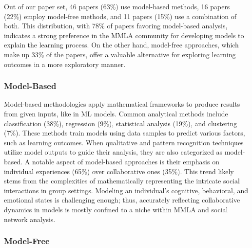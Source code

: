 \documentclass[manuscript,screen,review]{acmart}
\begin{document}
Out of our paper set, 46 papers (63\%) use model-based methods, 16 papers (22\%) employ model-free methods, and 11 papers (15\%) use a combination of both. This distribution, with 78\% of papers favoring model-based analysis, indicates a strong preference in the MMLA community for developing models to explain the learning process. On the other hand, model-free approaches, which make up 33\% of the papers, offer a valuable alternative for exploring learning outcomes in a more exploratory manner.

\subsubsection{Model-Based}

Model-based methodologies apply mathematical frameworks to produce results from given inputs, like in ML models. Common analytical methods include classification (38\%), regression (9\%), statistical analysis (19\%), and clustering (7\%). These methods train models using data samples to predict various factors, such as learning outcomes. When qualitative and pattern recognition techniques utilize model outputs to guide their analysis, they are also categorized as model-based. A notable aspect of model-based approaches is their emphasis on individual experiences (65\%) over collaborative ones (35\%). This trend likely stems from the complexities of mathematically representing the intricate social interactions in group settings. Modeling an individual's cognitive, behavioral, and emotional states is challenging enough; thus, accurately reflecting collaborative dynamics in models is mostly confined to a niche within MMLA and social network analysis.



\subsubsection{Model-Free}
\end{document}
